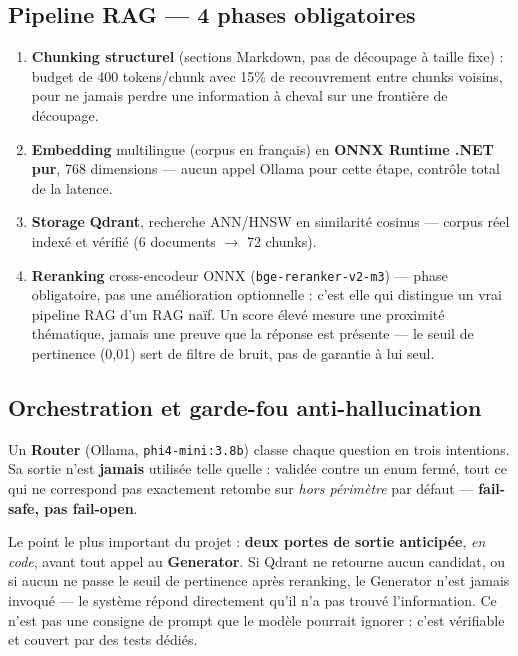 \documentclass[10.5pt,a4paper]{article}
\newcommand{\code}[1]{\texttt{\small #1}}
\begin{document}
\subsection{Pipeline RAG --- 4 phases obligatoires}
\begin{enumerate}
  \item \textbf{Chunking structurel} (sections Markdown, pas de d\'ecoupage \`a taille fixe) : budget de 400 tokens/chunk avec 15\% de recouvrement entre chunks voisins, pour ne jamais perdre une information \`a cheval sur une fronti\`ere de d\'ecoupage.
  \item \textbf{Embedding} multilingue (corpus en fran\c{c}ais) en \textbf{ONNX Runtime .NET pur}, 768 dimensions --- aucun appel Ollama pour cette \'etape, contr\^ole total de la latence.
  \item \textbf{Storage} \textbf{Qdrant}, recherche ANN/HNSW en similarit\'e cosinus --- corpus r\'eel index\'e et v\'erifi\'e (6 documents $\rightarrow$ 72 chunks).
  \item \textbf{Reranking} cross-encodeur ONNX (\code{bge-reranker-v2-m3}) --- phase obligatoire, pas une am\'elioration optionnelle : c'est elle qui distingue un vrai pipeline RAG d'un RAG na\"if. Un score \'elev\'e mesure une proximit\'e th\'ematique, jamais une preuve que la r\'eponse est pr\'esente --- le seuil de pertinence (0,01) sert de filtre de bruit, pas de garantie \`a lui seul.
\end{enumerate}

\subsection{Orchestration et garde-fou anti-hallucination}
Un \textbf{Router} (Ollama, \code{phi4-mini:3.8b}) classe chaque question en trois intentions. Sa sortie n'est \textbf{jamais} utilis\'ee telle quelle : valid\'ee contre un enum ferm\'e, tout ce qui ne correspond pas exactement retombe sur \emph{hors p\'erim\`etre} par d\'efaut --- \textbf{fail-safe, pas fail-open}.

Le point le plus important du projet : \textbf{deux portes de sortie anticip\'ee}, \emph{en code}, avant tout appel au \textbf{Generator}. Si Qdrant ne retourne aucun candidat, ou si aucun ne passe le seuil de pertinence apr\`es reranking, le Generator n'est jamais invoqu\'e --- le syst\`eme r\'epond directement qu'il n'a pas trouv\'e l'information. Ce n'est pas une consigne de prompt que le mod\`ele pourrait ignorer : c'est v\'erifiable et couvert par des tests d\'edi\'es.
\end{document}

